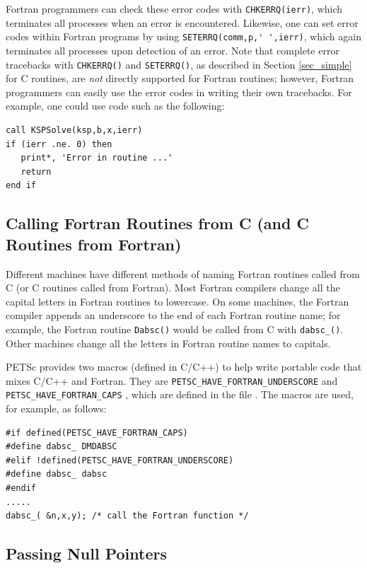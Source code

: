 Fortran programmers
can check these error codes with
\lstinline{CHKERRQ(ierr)}, which terminates all processes when an error is
encountered.  Likewise, one can set error codes within Fortran programs by
using \lstinline{SETERRQ(comm,p,' ',ierr)}, which again terminates all processes
upon detection of an error.
Note that complete error tracebacks with
\lstinline{CHKERRQ()} and \lstinline{SETERRQ()}, as described in Section
\ref{sec_simple} for C routines, are {\em not} directly supported for
Fortran routines; however, Fortran programmers can easily use the
error codes in writing their own tracebacks.  For example, one could
use code such as the following:
\begin{lstlisting}
call KSPSolve(ksp,b,x,ierr)
if (ierr .ne. 0) then
   print*, 'Error in routine ...'
   return
end if
\end{lstlisting}

\subsection{Calling Fortran Routines from C (and C Routines from Fortran)}


Different machines have
different methods of naming Fortran routines called from C
(or C routines called from Fortran). Most Fortran compilers change
all the capital letters in Fortran routines to lowercase. On some machines, the
Fortran compiler appends an underscore to the end of each Fortran
routine name; for example, the Fortran routine \lstinline{Dabsc()}
would be called from C with \lstinline{dabsc_()}.  Other machines
change all the letters in Fortran routine names to capitals.

PETSc provides two macros (defined in C/C++) to help write
portable code that mixes C/C++ and Fortran. They are
\lstinline{PETSC_HAVE_FORTRAN_UNDERSCORE} and \lstinline{PETSC_HAVE_FORTRAN_CAPS}
 ,
which are defined in the file .
The macros are used, for example, as follows:
\begin{lstlisting}
#if defined(PETSC_HAVE_FORTRAN_CAPS)
#define dabsc_ DMDABSC
#elif !defined(PETSC_HAVE_FORTRAN_UNDERSCORE)
#define dabsc_ dabsc
#endif
.....
dabsc_( &n,x,y); /* call the Fortran function */
\end{lstlisting}


\subsection{Passing Null Pointers}

